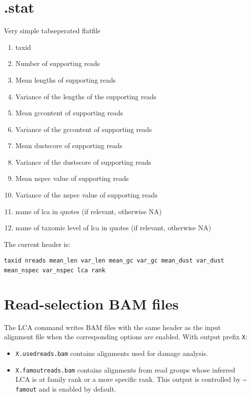 \documentclass[10pt]{article}
\begin{document}
\section{.stat}\label{sec:stat}
Very simple tabseperated flatfile
\begin{enumerate}
\item taxid
\item Number of supporting reads
\item Mean lengths of supporting reads
\item Variance of the lengths of the supporting reads
\item Mean gccontent of supporting reads
\item Variance of the gccontent of supporting reads
\item Mean dustscore of supporting reads
\item Variance of the dustscore of supporting reads
\item Mean nspec value of supporting reads
\item Variance of the nspec value of supporting reads
\item name of lca in quotes (if relevant, otherwise NA)
\item name of taxomic level of lca in quotes (if relevant, otherwise NA)
\end{enumerate}
The current header is:
\begin{verbatim}
taxid nreads mean_len var_len mean_gc var_gc mean_dust var_dust
mean_nspec var_nspec lca rank
\end{verbatim}
\section{Read-selection BAM files}
The LCA command writes BAM files with the same header as the input alignment
file when the corresponding options are enabled. With output prefix
\texttt{X}:
\begin{itemize}
\item \texttt{X.usedreads.bam} contains alignments used for damage analysis.
\item \texttt{X.famoutreads.bam} contains alignments from read groups whose
  inferred LCA is at family rank or a more specific rank. This output is
  controlled by \texttt{--famout} and is enabled by default.
\end{itemize}
\clearpage
\end{document}
